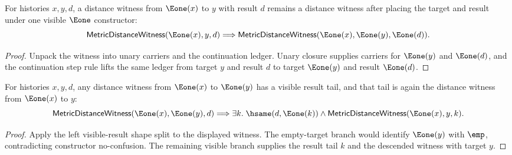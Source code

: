 \begin{theorem}
\label{thm:metric-distance-witness-left-e1-visible-target-step}
For histories $x,y,d$, a distance witness from $\Eone(x)$ to $y$ with result
$d$ remains a distance witness after placing the target and result under one
visible $\Eone$ constructor:
$$
\mathsf{MetricDistanceWitness}(\Eone(x),y,d)
\Longrightarrow
\mathsf{MetricDistanceWitness}(\Eone(x),\Eone(y),\Eone(d)).
$$
\end{theorem}
\begin{proof}
Unpack the witness into unary carriers and the continuation ledger. Unary
closure supplies carriers for $\Eone(y)$ and $\Eone(d)$, and the continuation
step rule lifts the same ledger from target $y$ and result $d$ to target
$\Eone(y)$ and result $\Eone(d)$.
\end{proof}

\begin{theorem}
\label{thm:metric-distance-witness-left-e1-visible-target-result-shape}
For histories $x,y,d$, any distance witness from $\Eone(x)$ to $\Eone(y)$ has
a visible result tail, and that tail is again the distance witness from
$\Eone(x)$ to $y$:
$$
\mathsf{MetricDistanceWitness}(\Eone(x),\Eone(y),d)
\Longrightarrow
\exists k.\;
\hsame(d,\Eone(k))\land
\mathsf{MetricDistanceWitness}(\Eone(x),y,k).
$$
\end{theorem}
\begin{proof}
Apply the left visible-result shape split to the displayed witness. The
empty-target branch would identify $\Eone(y)$ with $\emp$, contradicting
constructor no-confusion. The remaining visible branch supplies the result
tail $k$ and the descended witness with target $y$.
\end{proof}

